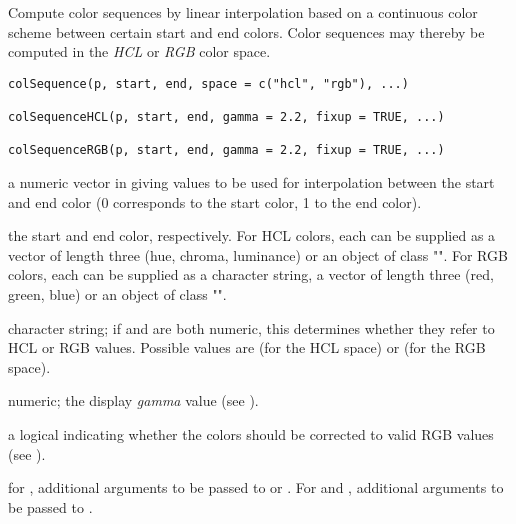 %
\begin{Description}\relax
Compute color sequences by linear interpolation based on a continuous color 
scheme between certain start and end colors.  Color sequences may thereby be 
computed in the \emph{HCL} or \emph{RGB} color space.
\end{Description}
%
\begin{Usage}
\begin{verbatim}
colSequence(p, start, end, space = c("hcl", "rgb"), ...)

colSequenceHCL(p, start, end, gamma = 2.2, fixup = TRUE, ...)

colSequenceRGB(p, start, end, gamma = 2.2, fixup = TRUE, ...)
\end{verbatim}
\end{Usage}
%
\begin{Arguments}
\begin{ldescription}
\item[\code{p}] a numeric vector in \eqn{$[0,1]$}{} giving values to be used 
for interpolation between the start and end color (0 corresponds to the 
start color, 1 to the end color).
\item[\code{start, end}] the start and end color, respectively.  For HCL colors, 
each can be supplied as a vector of length three (hue, chroma, luminance) 
or an object of class "".  For 
RGB colors, each can be supplied as a character string, a vector of length 
three (red, green, blue) or an object of class 
"".
\item[\code{space}] character string; if  and  are both 
numeric, this determines whether they refer to HCL or RGB values.  Possible 
values are  (for the HCL space) or  (for the RGB 
space).
\item[\code{gamma}] numeric; the display \emph{gamma} value (see 
).
\item[\code{fixup}] a logical indicating whether the colors should be corrected to 
valid RGB values (see ).
\item[\code{...}] for , additional arguments to be passed to 
 or .  For  
and , additional arguments to be passed to 
.
\end{ldescription}
\end{Arguments}
